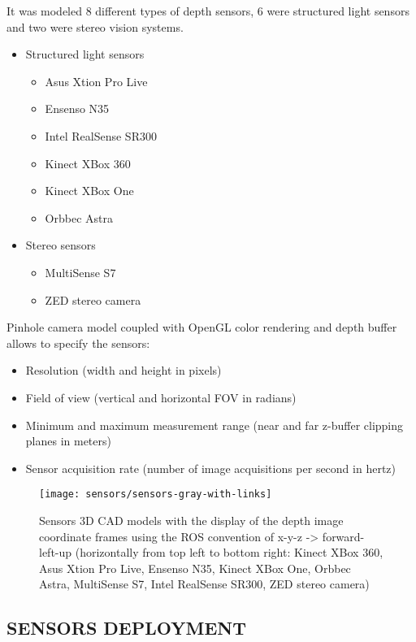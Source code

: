 It was modeled 8 different types of depth sensors, 6 were structured light sensors and two were stereo vision systems.

\begin{itemize}
	\item Structured light sensors
	\begin{itemize}
		\item Asus Xtion Pro Live
		\item Ensenso N35
		\item Intel RealSense SR300
		\item Kinect XBox 360
		\item Kinect XBox One
		\item Orbbec Astra
	\end{itemize}
	\item Stereo sensors
	\begin{itemize}
		\item MultiSense S7
		\item ZED stereo camera
	\end{itemize}
\end{itemize}
Pinhole camera model coupled with OpenGL color rendering and depth buffer allows to specify the sensors:
\begin{itemize}
	\item Resolution (width and height in pixels)
	\item Field of view (vertical and horizontal FOV in radians)
	\item Minimum and maximum measurement range (near and far z-buffer clipping planes in meters)
	\item Sensor acquisition rate (number of image acquisitions per second in hertz)
\end{itemize}

\begin{figure}
	\centering
	\texttt{[image: sensors/sensors-gray-with-links]}
	\caption{Sensors 3D CAD models with the display of the depth image coordinate frames using the ROS convention of x-y-z -> forward-left-up (horizontally from top left to bottom right: Kinect XBox 360, Asus Xtion Pro Live, Ensenso N35, Kinect XBox One, Orbbec Astra, MultiSense S7, Intel RealSense SR300, ZED stereo camera)}
\end{figure}


\subsection{\uppercase{Sensors deployment}}\label{subsec:sensors-deployment}

